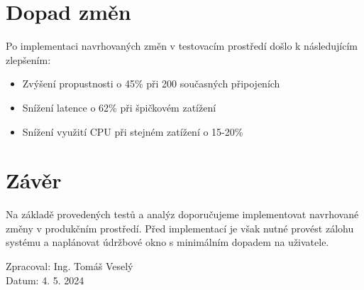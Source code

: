\documentclass[a4paper,12pt]{article}
\begin{document}
\section{Dopad změn}
Po implementaci navrhovaných změn v testovacím prostředí došlo k následujícím zlepšením:
\begin{itemize}
    \item Zvýšení propustnosti o 45\% při 200 současných připojeních
    \item Snížení latence o 62\% při špičkovém zatížení
    \item Snížení využití CPU při stejném zatížení o 15-20\%
\end{itemize}

\section{Závěr}
Na základě provedených testů a analýz doporučujeme implementovat navrhované změny v produkčním prostředí. Před implementací je však nutné provést zálohu systému a naplánovat údržbové okno s minimálním dopadem na uživatele.

\vspace{1cm}

\begin{flushright}
Zpracoval: Ing. Tomáš Veselý \\
Datum: 4. 5. 2024
\end{flushright}
\end{document}
